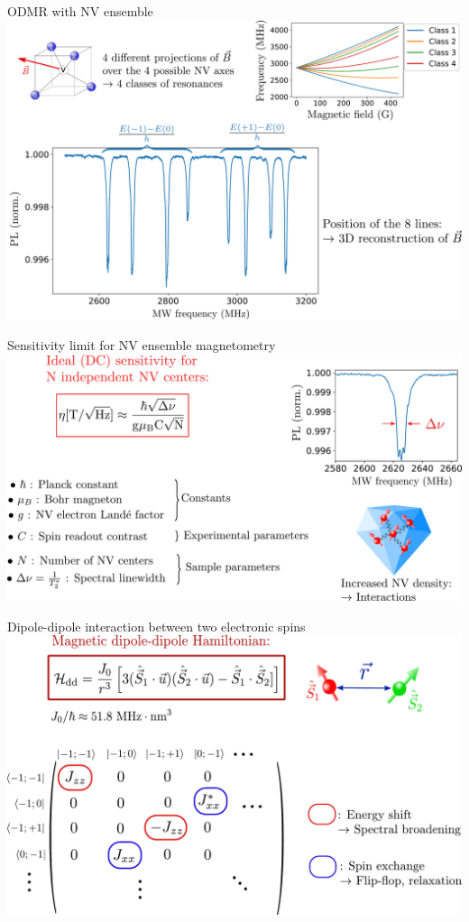 \documentclass{beamer}
\begin{document}
\begin{frame}{ODMR with NV ensemble}
\centering
\includegraphics[width=\textwidth,height=0.9\textheight,keepaspectratio]{Slide_ODMR_8_classes}
\end{frame}

\begin{frame}{Sensitivity limit for NV ensemble magnetometry}
\centering
\includegraphics[width=\textwidth,height=0.9\textheight,keepaspectratio]{Slide_NV_ensemble_sensi}
\end{frame}

\begin{frame}{Dipole-dipole interaction between two electronic spins}
\centering
\includegraphics[width=\textwidth,height=0.9\textheight,keepaspectratio]{Slide_dipole_dipole}
\end{frame}
\end{document}
